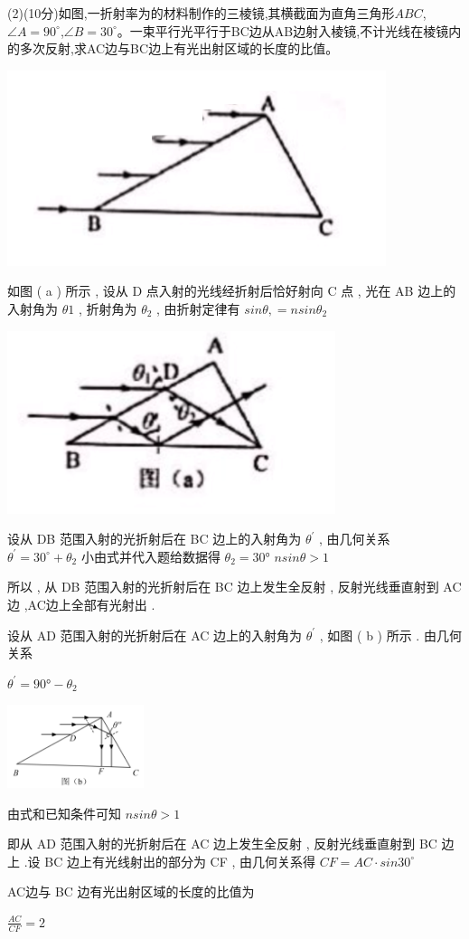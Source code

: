 (2)(10分)如图,一折射率为的材料制作的三棱镜,其横截面为直角三角形$ABC$,$\angle A=90^∘$,$\angle B=30^∘$。一束平行光平行于BC边从AB边射入棱镜,不计光线在棱镜内的多次反射,求AC边与BC边上有光出射区域的长度的比值。\begin{center}\includegraphics[]{img/image14.png}\end{center}
\begin{solution}{4cm}
如图 ( a ) 所示 , 设从 D 点入射的光线经折射后恰好射向 C 点 , 光在 AB 边上的入射角为 $θ 1$ , 
折射角为 $θ_2$ , 由折射定律有 $sin θ , = nsin θ _2$  
\begin{center}\includegraphics[]{img/image15.png}\end{center}
设从 DB 范围入射的光折射后在 BC 边上的入射角为 $θ ^\prime$ , 由几何关系 $θ ^\prime = 30 ^∘ + θ _2$ 小由式并代入题给数据得
$θ_2  = 30 °$
$nsin θ > 1$  

所以 , 从 DB 范围入射的光折射后在 BC 边上发生全反射 , 反射光线垂直射到 AC 边 ,AC边上全部有光射出 .

设从 AD 范围入射的光折射后在 AC 边上的入射角为 $θ ^\prime$ , 如图 ( b ) 所示 . 由几何关系

$θ ^\prime = 90 ° - θ _2$  
\begin{center}\includegraphics[width=4cm]{img/image16.png}\end{center}
由式和已知条件可知 
$nsin θ > 1$  

即从 AD 范围入射的光折射后在 AC 边上发生全反射 , 反射光线垂直射到 BC 边上 .设 BC 边上有光线射出的部分为 CF , 由几何关系得 
$CF = AC · sin 30 ^∘$ 

AC边与 BC 边有光出射区域的长度的比值为 

$\frac{AC}{CF}=2$  
\end{solution}
